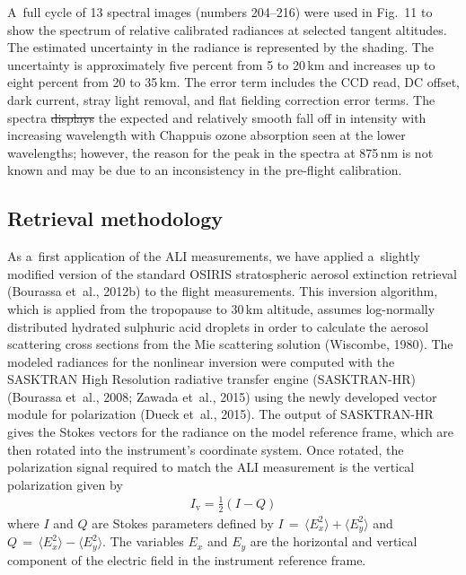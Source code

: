 \documentclass[amtd, online, hvmath]{copernicus}
\providecommand{\DIFadd}[1]{{\protect\color{blue}\uwave{#1}}} %
\providecommand{\DIFdel}[1]{{\protect\color{red}\sout{#1}}}                      %
\providecommand{\DIFaddbegin}{} %
\providecommand{\DIFaddend}{} %
\providecommand{\DIFdelbegin}{} %
\providecommand{\DIFdelend}{} %
\begin{document}
A~full cycle of 13 spectral images (numbers 204--216) were used in Fig.~11 to
show the spectrum of relative calibrated radiances at selected tangent
altitudes. The estimated uncertainty in the radiance is represented by the
shading. The uncertainty is approximately five percent from 5 to
20\,\unit{km} and increases up to eight percent from 20 to 35\,\unit{km}. The
error term includes the CCD read, DC offset, dark current, stray light
removal, and flat fielding correction error terms. The spectra \DIFdelbegin \DIFdel{displays }\DIFdelend \DIFaddbegin \DIFadd{display }\DIFaddend the
expected and relatively smooth fall off in intensity with increasing
wavelength with Chappuis ozone absorption seen at the lower wavelengths;
however, the reason for the peak in the spectra at 875\,\unit{nm} is not
known and may be due to an inconsistency in the pre-flight calibration.

\subsection{Retrieval methodology}

As a~first application of the ALI measurements, we have applied
a~slightly modified version of the standard OSIRIS stratospheric
aerosol extinction retrieval (Bourassa et~al., 2012b) to the flight
measurements. This inversion algorithm, which is applied from the
tropopause to 30\,\unit{km} altitude, assumes log-normally distributed
hydrated sulphuric acid droplets in order to calculate the aerosol
scattering cross sections from the Mie scattering solution (Wiscombe,
1980). The modeled radiances for the nonlinear inversion were computed
with the SASKTRAN High Resolution radiative transfer engine
(SASKTRAN-HR) (Bourassa et~al., 2008; Zawada et~al., 2015) using the
newly developed vector module for polarization (Dueck et~al.,
2015). The output of SASKTRAN-HR gives the Stokes vectors for the
radiance on the model reference frame, which are then rotated into the
instrument's coordinate system. Once rotated, the polarization signal
required to match the ALI measurement is the vertical polarization
given by
\begin{align}
I_{\mathrm{v}}=\frac{1}{2}\left(I-Q \right)
\end{align}
where $I$ and $Q$ are Stokes parameters defined by $I\,=\,\langle
E_x^2\rangle + \langle E_y^2\rangle$ and $Q\,=\,\langle E_x^2\rangle -
\langle E_y^2\rangle$. The variables $E_{x}$ and $E_{y}$ are the
horizontal and vertical component of the electric field in the
instrument reference frame.
\end{document}
